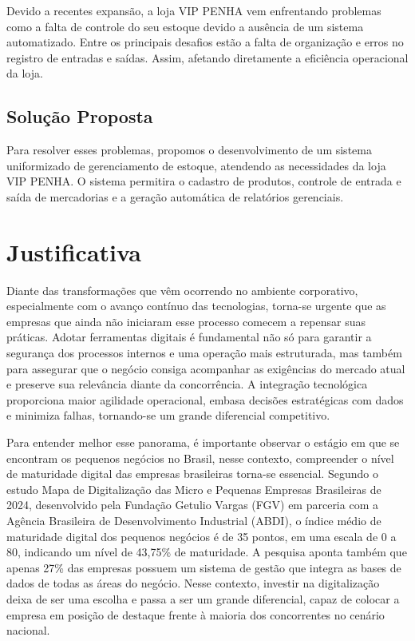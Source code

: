 \documentclass[
	12pt,				%
	openany,			%
	twoside,			%
	a4paper,			%
	english,			%
	brazil				%
	]{abntex2}
\begin{document}
Devido a recentes expansão, a loja VIP PENHA vem enfrentando problemas como a falta de controle do seu estoque devido a ausência de um sistema automatizado. Entre os principais desafios estão a falta de organização e erros no registro de entradas e saídas. Assim, afetando diretamente a eficiência operacional da loja.

\subsection{Solução Proposta}

Para resolver esses problemas, propomos o desenvolvimento de um sistema uniformizado de gerenciamento de estoque, atendendo as necessidades da loja VIP PENHA. O sistema permitira o cadastro de produtos, controle de entrada e saída de mercadorias e a geração automática de relatórios gerenciais.  

\section{Justificativa}
Diante das transformações que vêm ocorrendo no ambiente corporativo, especialmente com o avanço contínuo das tecnologias, torna-se urgente que as empresas que ainda não iniciaram esse processo comecem a repensar suas práticas. Adotar ferramentas digitais é fundamental não só para garantir a segurança dos processos internos e uma operação mais estruturada, mas também para assegurar que o negócio consiga acompanhar as exigências do mercado atual e preserve sua relevância diante da concorrência. A integração tecnológica proporciona maior agilidade operacional, embasa decisões estratégicas com dados e minimiza falhas, tornando-se um grande diferencial competitivo.

Para entender melhor esse panorama, é importante observar o estágio em que se encontram os pequenos negócios no Brasil, nesse contexto, compreender o nível de maturidade digital das empresas brasileiras torna-se essencial. Segundo o estudo Mapa de Digitalização das Micro e Pequenas Empresas Brasileiras de 2024, desenvolvido pela Fundação Getulio Vargas (FGV) em parceria com a Agência Brasileira de Desenvolvimento Industrial (ABDI), o índice médio de maturidade digital dos pequenos negócios é de 35 pontos, em uma escala de 0 a 80, indicando um nível de 43,75\% de maturidade. A pesquisa aponta também que apenas 27\% das empresas possuem um sistema de gestão que integra as bases de dados de todas as áreas do negócio. Nesse contexto, investir na digitalização deixa de ser uma escolha e passa a ser um grande diferencial, capaz de colocar a empresa em posição de destaque frente à maioria dos concorrentes no cenário nacional.
\end{document}
